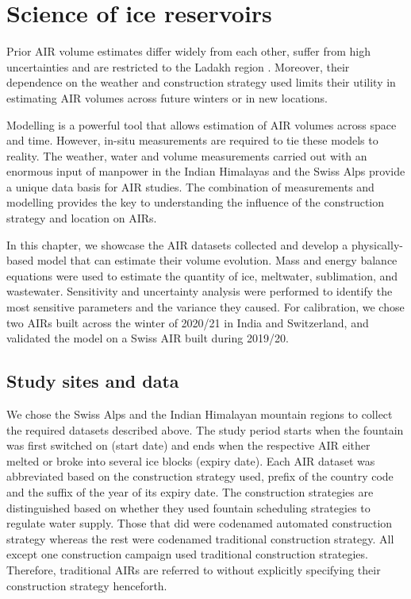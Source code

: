 \chapter{Science of ice reservoirs}
\label{chap:science}


Prior AIR volume estimates differ widely from each other, suffer from high uncertainties and are restricted to
the Ladakh region \citep{nusserSociohydrologyArtificialGlaciers2019, norphelSnowWaterHarvesting2015}. Moreover,
their dependence on the weather and construction strategy used limits their utility in estimating AIR volumes
across future winters or in new locations.  

Modelling is a powerful tool that allows estimation of AIR volumes across space and time. However, in-situ
measurements are required to tie these models to reality. The weather, water and volume measurements carried out
with an enormous input of manpower in the Indian Himalayas and the Swiss Alps provide a unique data basis for
AIR studies. The combination of measurements and modelling provides the key to understanding the influence of
the construction strategy and location on \ac{AIRs}. 

In this chapter, we showcase the AIR datasets collected and develop a physically-based model that can estimate
their volume evolution. Mass and energy balance equations were used to estimate the quantity of ice, meltwater,
sublimation, and wastewater. Sensitivity and uncertainty analysis were performed to identify the most sensitive
parameters and the variance they caused. For calibration, we chose two \ac{AIRs} built across the winter of 2020/21
in India and Switzerland, and validated the model on a Swiss AIR built during 2019/20. 


\section{Study sites and data}

We chose the Swiss Alps and the Indian Himalayan mountain regions to collect the required datasets described
above. The study period starts when the fountain was first switched on (start date) and ends when the respective
AIR either melted or broke into several ice blocks (expiry date).  Each AIR dataset was abbreviated based on the
construction strategy used, prefix of the country code and the suffix of the year of its expiry date. The
construction strategies are distinguished based on whether they used fountain scheduling strategies to regulate
water supply. Those that did were codenamed automated construction strategy whereas the rest were codenamed
traditional construction strategy. All except one construction campaign used traditional construction
strategies. Therefore, traditional \ac{AIRs} are referred to without explicitly specifying their construction
strategy henceforth.

